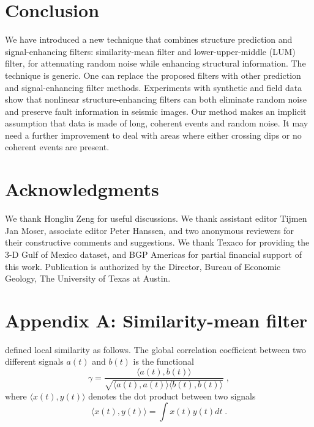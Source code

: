
 \section{Conclusion}

We have introduced a new technique that combines structure prediction
and signal-enhancing filters: similarity-mean filter and
lower-upper-middle (LUM) filter, for attenuating random noise while
enhancing structural information. The technique is generic. One can
replace the proposed filters with other prediction and
signal-enhancing filter methods. Experiments with synthetic and field
data show that nonlinear structure-enhancing filters can both
eliminate random noise and preserve fault information in seismic
images. Our method makes an implicit assumption that data is made of
long, coherent events and random noise. It may need a further
improvement to deal with areas where either crossing dips or no
coherent events are present.

\section{Acknowledgments}

We thank Hongliu Zeng for useful discussions. We thank assistant
editor Tijmen Jan Moser, associate editor Peter Hanssen, and two
anonymous reviewers for their constructive comments and
suggestions. We thank Texaco for providing the 3-D Gulf of Mexico
dataset, and BGP Americas for partial financial support of this
work. Publication is authorized by the Director, Bureau of Economic
Geology, The University of Texas at Austin.

\appendix
\section{Appendix A: Similarity-mean filter}

\cite{Fomel07a} defined local similarity as follows. The global 
correlation coefficient between two different signals $a(t)$ and
$b(t)$ is the functional
\begin{equation}
  \label{eq:sweight1}
     \gamma = \frac {\langle a(t),b(t)\rangle}{\sqrt{\langle a(t),a(t)\rangle \langle b(t),b(t)\rangle}}\;,
\end{equation} 
where $\langle x(t),y(t)\rangle$ denotes the dot product between two signals
\begin{equation}
  \label{eq:sweight2}
     \langle x(t),y(t)\rangle = \int x(t)y(t)dt\;.
\end{equation} 

